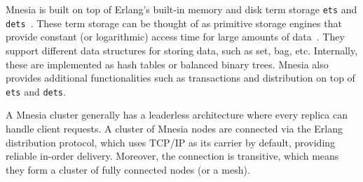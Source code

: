 Mnesia is built on top of Erlang's built-in memory and disk term storage
\texttt{ets} and \texttt{dets}~\cite{ericssonab2023stdlib}.  These term storage
can be thought of as primitive storage engines that provide constant (or
logarithmic) access time for large amounts of data~\cite{hebert2013LYSE}.
They support different data structures for storing data, such as set, 
bag, etc.  Internally, these are implemented as hash tables or balanced binary trees.
Mnesia also provides additional functionalities such as transactions and 
distribution on top of \texttt{ets} and \texttt{dets}.

A Mnesia cluster generally has a leaderless architecture where every replica can 
handle client requests. A cluster of Mnesia nodes are connected via the
Erlang distribution protocol, which uses TCP/IP as its carrier by default, providing
reliable in-order delivery. Moreover, the connection is transitive, 
which means they form a cluster of fully connected nodes (or a mesh).







